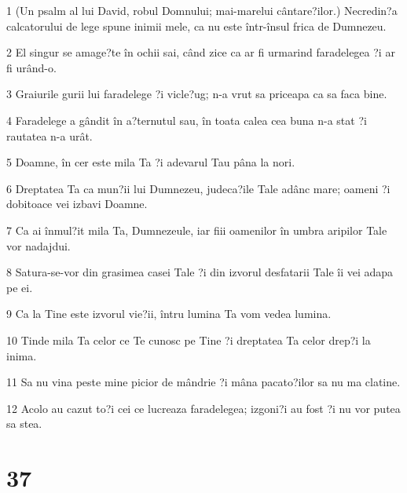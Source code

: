 \par 1 (Un psalm al lui David, robul Domnului; mai-marelui cântare?ilor.) Necredin?a calcatorului de lege spune inimii mele, ca nu este într-însul frica de Dumnezeu.
\par 2 El singur se amage?te în ochii sai, când zice ca ar fi urmarind faradelegea ?i ar fi urând-o.
\par 3 Graiurile gurii lui faradelege ?i vicle?ug; n-a vrut sa priceapa ca sa faca bine.
\par 4 Faradelege a gândit în a?ternutul sau, în toata calea cea buna n-a stat ?i rautatea n-a urât.
\par 5 Doamne, în cer este mila Ta ?i adevarul Tau pâna la nori.
\par 6 Dreptatea Ta ca mun?ii lui Dumnezeu, judeca?ile Tale adânc mare; oameni ?i dobitoace vei izbavi Doamne.
\par 7 Ca ai înmul?it mila Ta, Dumnezeule, iar fiii oamenilor în umbra aripilor Tale vor nadajdui.
\par 8 Satura-se-vor din grasimea casei Tale ?i din izvorul desfatarii Tale îi vei adapa pe ei.
\par 9 Ca la Tine este izvorul vie?ii, întru lumina Ta vom vedea lumina.
\par 10 Tinde mila Ta celor ce Te cunosc pe Tine ?i dreptatea Ta celor drep?i la inima.
\par 11 Sa nu vina peste mine picior de mândrie ?i mâna pacato?ilor sa nu ma clatine.
\par 12 Acolo au cazut to?i cei ce lucreaza faradelegea; izgoni?i au fost ?i nu vor putea sa stea.

\chapter{37}

